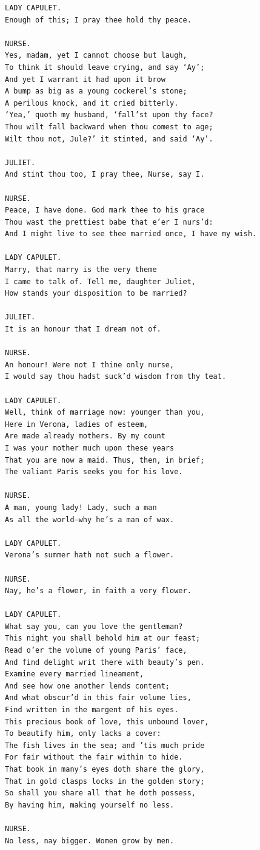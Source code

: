 \documentclass{article}
\begin{document}
\begin{verbatim}
LADY CAPULET.
Enough of this; I pray thee hold thy peace.

NURSE.
Yes, madam, yet I cannot choose but laugh,
To think it should leave crying, and say ‘Ay’;
And yet I warrant it had upon it brow
A bump as big as a young cockerel’s stone;
A perilous knock, and it cried bitterly.
‘Yea,’ quoth my husband, ‘fall’st upon thy face?
Thou wilt fall backward when thou comest to age;
Wilt thou not, Jule?’ it stinted, and said ‘Ay’.

JULIET.
And stint thou too, I pray thee, Nurse, say I.

NURSE.
Peace, I have done. God mark thee to his grace
Thou wast the prettiest babe that e’er I nurs’d:
And I might live to see thee married once, I have my wish.

LADY CAPULET.
Marry, that marry is the very theme
I came to talk of. Tell me, daughter Juliet,
How stands your disposition to be married?

JULIET.
It is an honour that I dream not of.

NURSE.
An honour! Were not I thine only nurse,
I would say thou hadst suck’d wisdom from thy teat.

LADY CAPULET.
Well, think of marriage now: younger than you,
Here in Verona, ladies of esteem,
Are made already mothers. By my count
I was your mother much upon these years
That you are now a maid. Thus, then, in brief;
The valiant Paris seeks you for his love.

NURSE.
A man, young lady! Lady, such a man
As all the world—why he’s a man of wax.

LADY CAPULET.
Verona’s summer hath not such a flower.

NURSE.
Nay, he’s a flower, in faith a very flower.

LADY CAPULET.
What say you, can you love the gentleman?
This night you shall behold him at our feast;
Read o’er the volume of young Paris’ face,
And find delight writ there with beauty’s pen.
Examine every married lineament,
And see how one another lends content;
And what obscur’d in this fair volume lies,
Find written in the margent of his eyes.
This precious book of love, this unbound lover,
To beautify him, only lacks a cover:
The fish lives in the sea; and ’tis much pride
For fair without the fair within to hide.
That book in many’s eyes doth share the glory,
That in gold clasps locks in the golden story;
So shall you share all that he doth possess,
By having him, making yourself no less.

NURSE.
No less, nay bigger. Women grow by men.


\end{verbatim}
\end{document}
